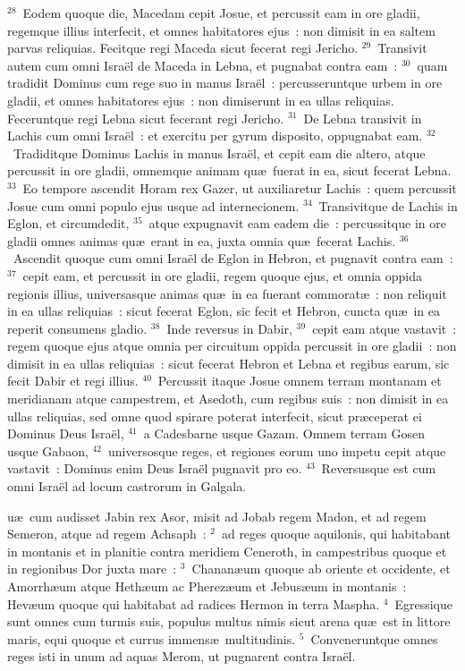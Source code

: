 ${}^{28}$~Eodem quoque die, Macedam cepit Josue, et percussit eam in ore gladii, regemque illius interfecit, et omnes habitatores ejus~: non dimisit in ea saltem parvas reliquias. Fecitque regi Maceda sicut fecerat regi Jericho.
${}^{29}$~Transivit autem cum omni Isra\"el de Maceda in Lebna, et pugnabat contra eam~:
${}^{30}$~quam tradidit Dominus cum rege suo in manus Isra\"el~: percusseruntque urbem in ore gladii, et omnes habitatores ejus~: non dimiserunt in ea ullas reliquias. Feceruntque regi Lebna sicut fecerant regi Jericho.
${}^{31}$~De Lebna transivit in Lachis cum omni Isra\"el~: et exercitu per gyrum disposito, oppugnabat eam.
${}^{32}$~Tradiditque Dominus Lachis in manus Isra\"el, et cepit eam die altero, atque percussit in ore gladii, omnemque animam qu\ae\ fuerat in ea, sicut fecerat Lebna.
${}^{33}$~Eo tempore ascendit Horam rex Gazer, ut auxiliaretur Lachis~: quem percussit Josue cum omni populo ejus usque ad internecionem.
${}^{34}$~Transivitque de Lachis in Eglon, et circumdedit,
${}^{35}$~atque expugnavit eam eadem die~: percussitque in ore gladii omnes animas qu\ae\ erant in ea, juxta omnia qu\ae\ fecerat Lachis.
${}^{36}$~Ascendit quoque cum omni Isra\"el de Eglon in Hebron, et pugnavit contra eam~:
${}^{37}$~cepit eam, et percussit in ore gladii, regem quoque ejus, et omnia oppida regionis illius, universasque animas qu\ae\ in ea fuerant commorat\ae~: non reliquit in ea ullas reliquias~: sicut fecerat Eglon, sic fecit et Hebron, cuncta qu\ae\ in ea reperit consumens gladio.
${}^{38}$~Inde reversus in Dabir,
${}^{39}$~cepit eam atque vastavit~: regem quoque ejus atque omnia per circuitum oppida percussit in ore gladii~: non dimisit in ea ullas reliquias~: sicut fecerat Hebron et Lebna et regibus earum, sic fecit Dabir et regi illius.
${}^{40}$~Percussit itaque Josue omnem terram montanam et meridianam atque campestrem, et Asedoth, cum regibus suis~: non dimisit in ea ullas reliquias, sed omne quod spirare poterat interfecit, sicut pr\ae ceperat ei Dominus Deus Isra\"el,
${}^{41}$~a Cadesbarne usque Gazam. Omnem terram Gosen usque Gabaon,
${}^{42}$~universosque reges, et regiones eorum uno impetu cepit atque vastavit~: Dominus enim Deus Isra\"el pugnavit pro eo.
${}^{43}$~Reversusque est cum omni Isra\"el ad locum castrorum in Galgala.

\bchapter
{}u\ae\ cum audisset Jabin rex Asor, misit ad Jobab regem Madon, et ad regem Semeron, atque ad regem Achsaph~:
${}^{2}$~ad reges quoque aquilonis, qui habitabant in montanis et in planitie contra meridiem Ceneroth, in campestribus quoque et in regionibus Dor juxta mare~:
${}^{3}$~Chanan\ae um quoque ab oriente et occidente, et Amorrh\ae um atque Heth\ae um ac Pherez\ae um et Jebus\ae um in montanis~: Hev\ae um quoque qui habitabat ad radices Hermon in terra Maspha.
${}^{4}$~Egressique sunt omnes cum turmis suis, populus multus nimis sicut arena qu\ae\ est in littore maris, equi quoque et currus immens\ae\ multitudinis.
${}^{5}$~Conveneruntque omnes reges isti in unum ad aquas Merom, ut pugnarent contra Isra\"el.


